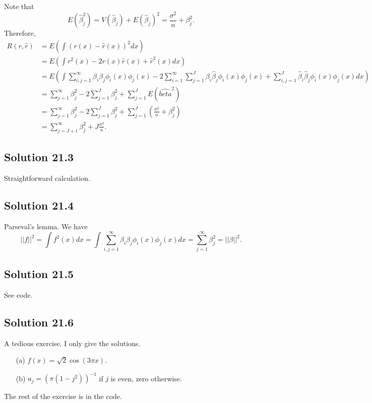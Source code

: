 Note that
\begin{equation*}
    E(\hat{\beta}_j^2) = V(\hat{\beta}_j) + E(\hat{\beta}_j)^2 = \frac{\sigma^2}{n} + \beta_j^2.
\end{equation*}
Therefore,
\begin{equation*}
    \begin{split}
        R(r, \hat{r}) &= E\left(\int (r(x) - \hat{r}(x))^2 dx\right) \\
            &= E\left(\int r^2(x) - 2r(x)\hat{r}(x) + \hat{r}^2(x) dx\right) \\
            &= E\left(\int \sum_{i, j = 1}^{\infty} \beta_i \beta_j \phi_i(x) \phi_j(x) - 2 \sum_{i = 1}^{\infty} \sum_{j = 1}^J \beta_i \hat{\beta}_j \phi_i(x) \phi_j(x) + \sum_{i, j = 1}^J \hat{\beta}_i \hat{\beta}_j \phi_i(x) \phi_j(x) dx\right) \\
            &= \sum_{j = 1}^{\infty} \beta_j^2 - 2\sum_{j = 1}^J \beta_j^2 + \sum_{j = 1}^J E(\hat{beta}^2) \\
            &= \sum_{j = 1}^{\infty} \beta_j^2 - 2\sum_{j = 1}^J \beta_j^2 + \sum_{j = 1}^J (\frac{\sigma^2}{n} + \beta_j^2) \\
            &= \sum_{j = J + 1}^{\infty} \beta_j^2 + J \frac{\sigma^2}{n}.
    \end{split}
\end{equation*}


\subsection*{Solution 21.3}

Straightforward calculation.


\subsection*{Solution 21.4}

Parseval's lemma.
We have
\begin{equation*}
    ||f||^2 = \int f^2(x) dx
        = \int \sum_{i, j = 1}^{\infty} \beta_i \beta_j \phi_i(x) \phi_j(x) dx
        = \sum_{j = 1}^{\infty} \beta_j^2
        = ||\beta||^2.
\end{equation*}


\subsection*{Solution 21.5}

See code.


\subsection*{Solution 21.6}

A tedious exercise.
I only give the solutions.
\begin{enumerate}
    \item[(a)] $f(x) = \sqrt{2} \cos(3 \pi x)$.
    \item[(b)] $a_j = (\pi (1 - j^2))^{-1}$ if $j$ is even, zero otherwise.
\end{enumerate}
The rest of the exercise is in the code.
